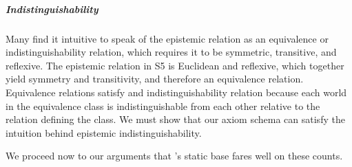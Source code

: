 \subparagraph{Indistinguishability}
Many find it intuitive to speak of the epistemic relation as an equivalence or indistinguishability relation, which requires it to be symmetric, transitive, and reflexive. The epistemic relation in S5 is Euclidean and reflexive, which together yield symmetry and transitivity, and therefore an equivalence relation. Equivalence relations satisfy and indistinguishability relation because each world in the equivalence class is indistinguishable from each other relative to the relation defining the class. We must show that our axiom schema can satisfy the intuition behind epistemic indistinguishability.

We proceed now to our arguments that \DASL's static base fares well on these counts.
%
